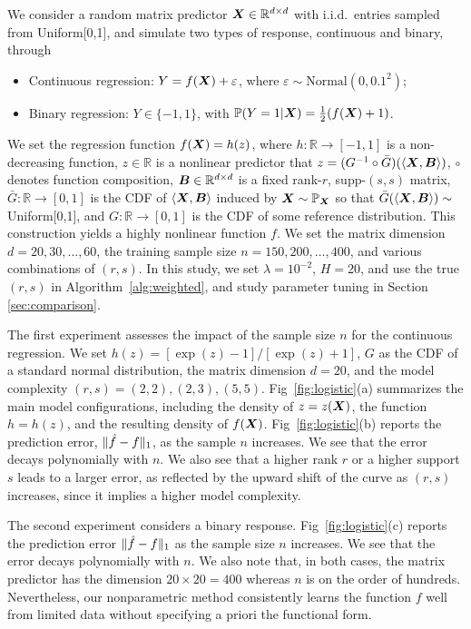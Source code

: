 \documentclass[11pt]{article}
\theoremstyle{plain}
\theoremstyle{definition}
\begin{document}
We consider a random matrix predictor $\bm X\in\mathbb{R}^{d\times d}$ with i.i.d.\ entries sampled from Uniform[0,1], and simulate two types of response, continuous and binary, through 
\begin{itemize}
\item Continuous regression: $Y=f(\bm X)+\varepsilon$, where $\varepsilon \sim \text{Normal}(0,0.1^2)$;
\item Binary regression: $Y\in\{-1,1\}$, with $\mathbb{P}(Y=1|\bm X)={1\over 2}(f(\bm X)+1)$.
\end{itemize}
We set the regression function $f(\bm X)=h(z)$, where $h\colon \mathbb{R}\to[-1,1]$ is a non-decreasing function, $z\in\mathbb{R}$ is a nonlinear predictor that $z= (G^{-1}\circ \bar G)(\langle \bm X, \bm B \rangle)$, $\circ$ denotes function composition, $\bm B\in\mathbb{R}^{d\times d}$ is a fixed rank-$r$, supp-$(s,s)$ matrix, $\bar G\colon \mathbb{R}\to[0,1]$ is the CDF of $\langle \bm X, \bm B \rangle$ induced by $\bm X\sim \mathbb{P}_{\bm X}$ so that $\bar G(\langle \bm X, \bm B \rangle)\sim$ Uniform[0,1], and $G\colon \mathbb{R}\to[0,1]$ is the CDF of some reference distribution. This construction yields a highly nonlinear function $f$. We set the matrix dimension $d=20,30,\ldots,60$, the training sample size $n=150, 200, \ldots, 400$, and various combinations of $(r,s)$. In this study, we set $\lambda=10^{-2}$, $H=20$, and use the true $(r,s)$ in Algorithm~\ref{alg:weighted}, and study parameter tuning in Section \ref{sec:comparison}. 

The first experiment assesses the impact of the sample size $n$ for the continuous regression. We set $h(z)=[\exp(z)-1] / [\exp(z)+1]$, $G$ as the CDF of a standard normal distribution, the matrix dimension $d=20$, and the model complexity $(r,s)=(2,2),(2,3),(5,5)$. Fig~\ref{fig:logistic}(a) summarizes the main model configurations, including the density of $z=z(\bm X)$, the function $h=h(z)$, and the resulting density of $f(\bm X)$. Fig~\ref{fig:logistic}(b) reports the prediction error, $\lVert\hat f - f\rVert_1$, as the sample $n$ increases. We see that the error decays polynomially with $n$. We also see that a higher rank $r$ or a higher support $s$ leads to a larger error, as reflected by the upward shift of the curve as $(r,s)$ increases, since it implies a higher model  complexity.  

The second experiment considers a binary response. Fig~\ref{fig:logistic}(c) reports the prediction error $\lVert\hat f - f\rVert_1$ as the sample size $n$ increases. We see that the error decays polynomially with $n$. We also note that, in both cases, the matrix predictor has the dimension $20 \times 20=400$ whereas $n$ is on the order of hundreds. Nevertheless, our nonparametric method consistently learns the function $f$ well from limited data without specifying a priori the functional form.
\end{document}
